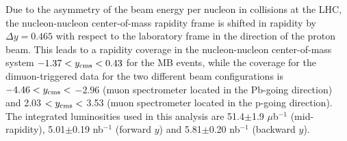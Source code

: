 Due to the asymmetry of the beam energy per nucleon in \ppb collisions at the LHC, the nucleon-nucleon center-of-mass rapidity frame is shifted in rapidity by $\Delta y =0.465$ with respect to the laboratory frame in the direction of the proton beam. This leads to a rapidity coverage in the nucleon-nucleon center-of-mass system $-1.37 < y_{\rm{cms}} < 0.43$ for the MB events, while the coverage for the dimuon-triggered data for the two different beam configurations is $-4.46 < y_{\rm{cms}} <$ $-2.96$ (muon spectrometer located in the Pb-going direction) 
and 2.03 $< y_{\rm{cms}} <$ 3.53 (muon spectrometer located in the p-going direction). The integrated luminosities used in this analysis are 51.4$\pm$1.9 $\mu$b$^{-1}$ (mid-rapidity), 5.01$\pm$0.19 nb$^{-1}$ (forward $y$) and 5.81$\pm$0.20 nb$^{-1}$ (backward $y$).
